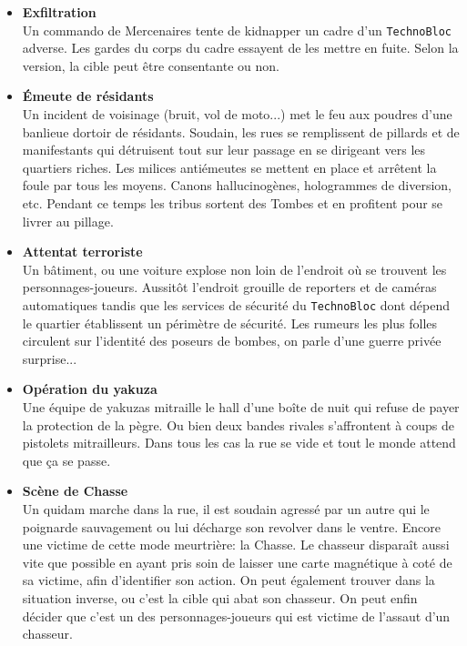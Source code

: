 \documentclass[11pt,twoside,a4paper]{article}
\begin{document}
{{\begin{minipage}[ht]{0.95\textwidth}
\begin{itemize}
		\item[] \textbf{Exfiltration}~\\
			Un commando de Mercenaires tente de kidnapper un cadre d'un \texttt{TechnoBloc} adverse. Les gardes du corps du cadre essayent de les mettre en fuite. Selon la version, la cible peut {\^e}tre consentante ou non. 
		\item[] \textbf{{\'E}meute de r{\'e}sidants}~\\
			Un incident de voisinage (bruit, vol de moto...) met le feu aux poudres d'une banlieue dortoir de r{\'e}sidants. Soudain, les rues se remplissent de pillards et de manifestants qui d{\'e}truisent tout sur leur passage en se dirigeant vers les quartiers riches. Les milices anti{\'e}meutes se mettent en place et arr{\^e}tent la foule par tous les moyens. Canons hallucinog{\`e}nes, hologrammes de diversion, etc. Pendant ce temps les tribus sortent des Tombes et en profitent pour se livrer au pillage. 
		\item[] \textbf{Attentat terroriste}~\\
			Un b{\^a}timent, ou une voiture explose non loin de l'endroit o{\`u} se trouvent les personnages-joueurs. Aussit{\^o}t l'endroit grouille de reporters et de cam{\'e}ras automatiques tandis que les services de s{\'e}curit{\'e} du \texttt{TechnoBloc} dont d{\'e}pend le quartier {\'e}tablissent un p{\'e}rim{\`e}tre de s{\'e}curit{\'e}. Les rumeurs les plus folles circulent sur l'identit{\'e} des poseurs de bombes, on parle d'une guerre priv{\'e}e surprise... 
		\item[] \textbf{Op{\'e}ration du yakuza}~\\
			Une {\'e}quipe de yakuzas mitraille le hall d'une bo{\^i}te de nuit qui refuse de payer la protection de la p{\`e}gre. Ou bien deux bandes rivales s'affrontent {\`a} coups de pistolets mitrailleurs. Dans tous les cas la rue se vide et tout le monde attend que \c{c}a se passe. 
		\item[] \textbf{Sc{\`e}ne de Chasse}~\\
			Un quidam marche dans la rue, il est soudain agress{\'e} par un autre qui le poignarde sauvagement ou lui d{\'e}charge son revolver dans le ventre. Encore une victime de cette mode meurtri{\`e}re: la Chasse. Le chasseur dispara{\^i}t aussi vite que possible en ayant pris soin de laisser une carte magn{\'e}tique {\`a} cot{\'e} de sa victime, afin d'identifier son action. On peut {\'e}galement trouver dans la situation inverse, ou c'est la cible qui abat son chasseur. On peut enfin d{\'e}cider que c'est un des personnages-joueurs qui est victime de l'assaut d'un chasseur. 

\end{itemize}
\end{minipage}}}
\end{document}
